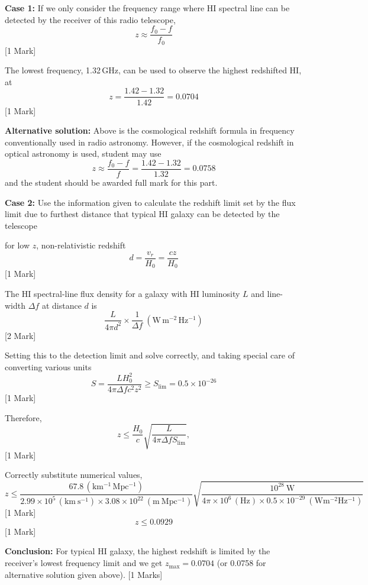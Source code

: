 \textbf{Case 1:} If we only consider the frequency range where HI spectral
line can be detected by the receiver of this radio telescope,
\[ z \approx \frac{f_0 - f}{f_0} \]
\hfill[1 Mark]

The lowest frequency, 1.32\,GHz, can be used to observe the highest
redshifted HI, at
\[ z = \frac{1.42 - 1.32}{1.42} = 0.0704 \]
\hfill[1 Mark]

\textbf{Alternative solution:} Above is the cosmological redshift formula in
frequency conventionally used in radio astronomy. However, if the
cosmological redshift in optical astronomy is used, student may use
\[ z \approx \frac{f_0 - f}{f} = \frac{1.42 - 1.32}{1.32} = 0.0758 \]
and the student should be awarded full mark for this part.

\textbf{Case 2:} Use the information given to calculate the redshift limit
set by the flux limit due to furthest distance that typical HI galaxy can be
detected by the telescope

for low $z$, non-relativistic redshift
\[ d = \frac{v_r}{H_0} = \frac{cz}{H_0} \]
\hfill[1 Mark]

The HI spectral-line flux density for a galaxy with HI luminosity $L$ and
line-width $\Delta f$ at distance $d$ is
\[ \frac{L}{4\pi d^2}\times\frac{1}{\Delta f}\
   (\mathrm{W\,m^{-2}\,Hz^{-1}}) \]
\hfill[2 Mark]

Setting this to the detection limit and solve correctly, and taking special
care of converting various units
\[ S = \frac{L H_0^2}{4\pi\Delta f c^2 z^2} \ge S_{\mathrm{lim}}
     = 0.5\times10^{-26} \]
\hfill[1 Mark]

Therefore,
\[ z \le \frac{H_0}{c}\sqrt{\frac{L}{4\pi\Delta f S_{\mathrm{lim}}}}, \]
\hfill[1 Mark]

Correctly substitute numerical values,
\[ z \le \frac{67.8\,(\mathrm{km^{-1}\,Mpc^{-1}})}
     {2.99\times10^{5}\,(\mathrm{km\ s^{-1}})\times
      3.08\times10^{22}\ (\mathrm{m\ Mpc^{-1}})}
   \sqrt{\frac{10^{28}\ \mathrm{W}}
     {4\pi\times10^{6}\,(\mathrm{Hz})\times0.5\times10^{-29}\
      (\mathrm{Wm^{-2}Hz^{-1}})}} \]
\hfill[1 Mark]
\[ z \le 0.0929 \]
\hfill[1 Mark]

\textbf{Conclusion:} For typical HI galaxy, the highest redshift is limited
by the receiver's lowest frequency limit and we get $z_{\max} = 0.0704$ (or
0.0758 for alternative solution given above). \hfill[1 Marks]


